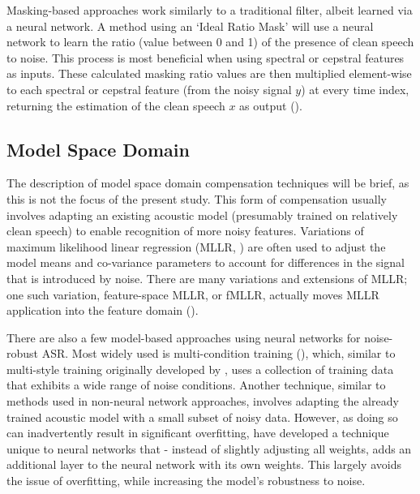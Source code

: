 Masking-based approaches work similarly to a traditional filter, albeit learned via a neural network. A method using an `Ideal Ratio Mask' will use a neural network to learn the ratio (value between 0 and 1) of the presence of clean speech to noise.  %
This process is most beneficial when using spectral or cepstral features as inputs.  These calculated masking ratio values are then multiplied element-wise to each spectral or cepstral feature (from the noisy signal $y$) at every time index, returning the estimation of the clean speech $x$ as output (\cite{zhang:17}).


\subsection{Model Space Domain}

The description of model space domain compensation techniques will be brief, as this is not the focus of the present study.  This form of compensation usually involves adapting an existing acoustic model (presumably trained on relatively clean speech) to enable recognition of more noisy features.  Variations of maximum likelihood linear regression (MLLR, \cite{leggetter:95}) are often used to adjust the %
model means and co-variance parameters to account for differences in the signal that is introduced by noise.  There are many variations and extensions of MLLR; one such variation, feature-space MLLR, or fMLLR, actually moves MLLR application into the feature domain (\cite{gales:98}).  

There are also a few model-based approaches using neural networks for noise-robust ASR.  Most widely used is multi-condition training (\cite{seltzer:13,zhang:17}), which, similar to multi-style training originally developed by \cite{lippman:87}, uses a collection of training data that exhibits a wide range of noise conditions.  Another technique, similar to methods used in non-neural network approaches, involves adapting the already trained acoustic model with a small subset of noisy data.  However, as doing so can inadvertently result in significant overfitting, \cite{mirsamadi:15} have developed a technique unique to neural networks that - instead of slightly adjusting all weights, adds an additional layer to the neural network with its own weights.  This largely avoids the issue of overfitting, while increasing the model's robustness to noise.

